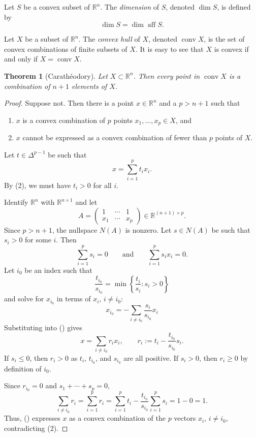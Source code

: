 \documentclass[12pt]{amsart}
\newtheorem{theorem}{Theorem}[section]
\theoremstyle{definition}
\theoremstyle{remark}
\numberwithin{equation}{section}
\newcommand{\RR}{\mathbb{R}}
\DeclareMathOperator{\conv}{conv}
\DeclareMathOperator{\aff}{aff}
\begin{document}
Let $S$ be a convex subset of $\RR^n$.
The \emph{dimension} of $S$, denoted $\dim S$, is defined by
\[
    \dim S = \dim\aff S.
\]

Let $X$ be a subset of $\RR^n$.
The \emph{convex hull} of $X$, denoted $\conv X$, is the set
of convex combinations of finite subsets of $X$.
It is easy to see that $X$ is convex if and only if $X=\conv X$.

\begin{theorem}[Carath\'eodory]
    Let $X\subset\RR^n$.
    Then every point in $\conv X$ is a combination of $n+1$ elements of $X$.
\end{theorem}

\begin{proof}
Suppose not. Then there is a point $x\in\RR^n$ and a $p>n+1$ such that
\begin{enumerate}
    \item $x$ is a convex combination of $p$ points $x_1,\ldots,x_p\in X$, and
    \item $x$ cannot be expressed as a convex combination of fewer than $p$ points of $X$.
\end{enumerate}
Let $t\in\Delta^{p-1}$ be such that
\[
    x=\sum_{i=1}^p t_ix_i\tag{\dag}.
\]
By (2), we must have $t_i>0$ for all $i$.

Identify $\RR^n$ with $\RR^{n\times 1}$ and let
\[
    A = \begin{pmatrix}
        1&\cdots&1\\
        x_1&\cdots&x_p
    \end{pmatrix}\in\RR^{(n+1)\times p}.
\]    
Since $p>n+1$, the nullspace $N(A)$ is nonzero.
Let $s\in N(A)$ be such that $s_i > 0$ for some $i$.
Then
\[
    \sum_{i=1}^p s_i=0\qquad\text{and}\qquad
    \sum_{i=1}^p s_ix_i = 0.
\]
Let $i_0$ be an index such that
\[
    \frac{t_{i_0}}{s_{i_0}} = \min\left\{\frac{t_i}{s_i} : s_i > 0\right\}
\]
and solve for $x_{i_0}$ in terms of $x_i$, $i\neq i_0$:
\[
    x_{i_0} = -\sum_{i\neq i_0}\frac{s_i}{s_{i_0}}x_i
\]
Substituting into (\dag) gives
\[
    x = \sum_{i\neq i_0}r_ix_i,\qquad
    r_i:= t_i - \frac{t_{i_0}}{s_{i_0}}s_i.\tag{\ddag}
\]
If $s_i\leq 0$, then $r_i>0$ as $t_i$, $t_{i_0}$, and $s_{i_0}$
are all positive.
If $s_i>0$, then $r_i\geq 0$ by definition of $i_0$.

Since $r_{i_0}=0$ and $s_1+\cdots+s_p=0$,
\[
\sum_{i\neq i_0} r_i = \sum_{i=1}^p r_i = 
\sum_{i=1}^p t_i - \frac{t_{i_0}}{s_{i_0}}\sum_{i=1}^p s_i
= 1 - 0 = 1.
\]
Thus, (\ddag) expresses $x$ as a convex combination of the
$p$ vectors $x_i$, $i\neq i_0$, contradicting (2).
\end{proof}
\end{document}
